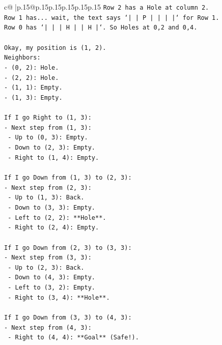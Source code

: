 \documentclass{article}
\begin{document}
{\begin{supertabular}{c@{$\;$}|p{.15\linewidth}@{}p{.15\linewidth}p{.15\linewidth}p{.15\linewidth}p{.15\linewidth}p{.15\linewidth}}
{{{\texttt{Row 2 has a Hole at column 2.} \\
\texttt{Row 1 has... wait, the text says `| | P | | | |` for Row 1.} \\
\texttt{Row 0 has `| | | H | | H |`. So Holes at 0,2 and 0,4.} \\
\\ 
\texttt{Okay, my position is (1, 2).} \\
\texttt{Neighbors:} \\
\texttt{{-} (0, 2): Hole.} \\
\texttt{{-} (2, 2): Hole.} \\
\texttt{{-} (1, 1): Empty.} \\
\texttt{{-} (1, 3): Empty.} \\
\\ 
\texttt{If I go Right to (1, 3):} \\
\texttt{{-} Next step from (1, 3):} \\
\texttt{    {-} Up to (0, 3): Empty.} \\
\texttt{    {-} Down to (2, 3): Empty.} \\
\texttt{    {-} Right to (1, 4): Empty.} \\
\\ 
\texttt{If I go Down from (1, 3) to (2, 3):} \\
\texttt{{-} Next step from (2, 3):} \\
\texttt{    {-} Up to (1, 3): Back.} \\
\texttt{    {-} Down to (3, 3): Empty.} \\
\texttt{    {-} Left to (2, 2): **Hole**.} \\
\texttt{    {-} Right to (2, 4): Empty.} \\
\\ 
\texttt{If I go Down from (2, 3) to (3, 3):} \\
\texttt{{-} Next step from (3, 3):} \\
\texttt{    {-} Up to (2, 3): Back.} \\
\texttt{    {-} Down to (4, 3): Empty.} \\
\texttt{    {-} Left to (3, 2): Empty.} \\
\texttt{    {-} Right to (3, 4): **Hole**.} \\
\\ 
\texttt{If I go Down from (3, 3) to (4, 3):} \\
\texttt{{-} Next step from (4, 3):} \\
\texttt{    {-} Right to (4, 4): **Goal** (Safe!).} \\
}}}
\end{supertabular}}
\end{document}
